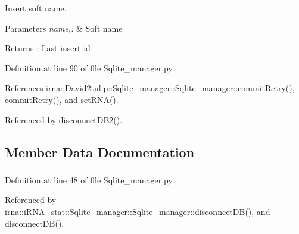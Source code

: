 \-Insert soft name. 


\begin{DoxyParams}{\-Parameters}
{\em name,\-:} & \-Soft name \\
\hline
\end{DoxyParams}
\begin{DoxyReturn}{\-Returns}
\-: \-Last insert id 
\end{DoxyReturn}


\-Definition at line 90 of file \-Sqlite\-\_\-manager.\-py.



\-References irna\-::\-David2tulip\-::\-Sqlite\-\_\-manager\-::\-Sqlite\-\_\-manager\-::commit\-Retry(), commit\-Retry(), and set\-R\-N\-A().



\-Referenced by disconnect\-D\-B2().



\subsection{\-Member \-Data \-Documentation}
\hypertarget{classirna_1_1iRNA__pred_1_1Sqlite__manager_1_1Sqlite__manager_a4bfee60ded8574f01d14edb8c64c9725}{
\subsubsection[{conn}]{}}
\label{classirna_1_1iRNA__pred_1_1Sqlite__manager_1_1Sqlite__manager_a4bfee60ded8574f01d14edb8c64c9725}


\-Definition at line 48 of file \-Sqlite\-\_\-manager.\-py.



\-Referenced by irna\-::i\-R\-N\-A\-\_\-stat\-::\-Sqlite\-\_\-manager\-::\-Sqlite\-\_\-manager\-::disconnect\-D\-B(), and disconnect\-D\-B().

\hypertarget{classirna_1_1iRNA__pred_1_1Sqlite__manager_1_1Sqlite__manager_ad0b959a24ff11ec813d46f1fc61ec96f}{
\subsubsection[{conn2}]{}}
\label{classirna_1_1iRNA__pred_1_1Sqlite__manager_1_1Sqlite__manager_ad0b959a24ff11ec813d46f1fc61ec96f}


